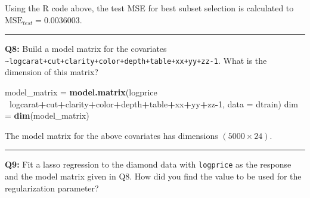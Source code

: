 \documentclass[]{article}
\newenvironment{Shaded}{\begin{snugshade}}{\end{snugshade}}
\newcommand{\KeywordTok}[1]{\textcolor[rgb]{0.13,0.29,0.53}{\textbf{#1}}}
\newcommand{\DataTypeTok}[1]{\textcolor[rgb]{0.13,0.29,0.53}{#1}}
\newcommand{\DecValTok}[1]{\textcolor[rgb]{0.00,0.00,0.81}{#1}}
\newcommand{\StringTok}[1]{\textcolor[rgb]{0.31,0.60,0.02}{#1}}
\newcommand{\CommentTok}[1]{\textcolor[rgb]{0.56,0.35,0.01}{\textit{#1}}}
\newcommand{\OperatorTok}[1]{\textcolor[rgb]{0.81,0.36,0.00}{\textbf{#1}}}
\newcommand{\NormalTok}[1]{#1}
\begin{document}
Using the R code above, the test MSE for best subset selection is
calculated to \(\text{MSE}_{test} = 0.0036003\).

\begin{center}\rule{0.5\linewidth}{\linethickness}\end{center}

\textbf{Q8:} Build a model matrix for the covariates
\texttt{\textasciitilde{}logcarat+cut+clarity+color+depth+table+xx+yy+zz-1}.
What is the dimension of this matrix?

\begin{Shaded}
\begin{Highlighting}[]
\NormalTok{model_matrix =}\StringTok{ }\KeywordTok{model.matrix}\NormalTok{(logprice }\OperatorTok{~}\NormalTok{logcarat}\OperatorTok{+}\NormalTok{cut}\OperatorTok{+}\NormalTok{clarity}\OperatorTok{+}\NormalTok{color}\OperatorTok{+}\NormalTok{depth}\OperatorTok{+}\NormalTok{table}\OperatorTok{+}\NormalTok{xx}\OperatorTok{+}\NormalTok{yy}\OperatorTok{+}\NormalTok{zz}\OperatorTok{-}\DecValTok{1}\NormalTok{, }\DataTypeTok{data =}\NormalTok{ dtrain)}
\NormalTok{dim =}\StringTok{ }\KeywordTok{dim}\NormalTok{(model_matrix)}
\end{Highlighting}
\end{Shaded}

The model matrix for the above covariates has dimensions
\((5000 \times 24)\).

\begin{center}\rule{0.5\linewidth}{\linethickness}\end{center}

\textbf{Q9:} Fit a lasso regression to the diamond data with
\texttt{logprice} as the response and the model matrix given in Q8. How
did you find the value to be used for the regularization parameter?

\begin{Shaded}
\end{Shaded}
\end{document}
